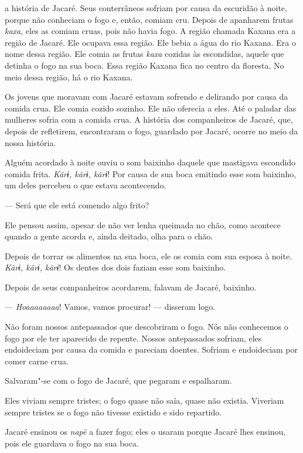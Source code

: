  

 a história de Jacaré. Seus conterrâneos sofriam por causa
da escuridão à noite, porque não conheciam o fogo e, então, comiam cru.
Depois de apanharem frutas \emph{kaxa}, eles as comiam cruas, pois não
havia fogo. A região chamada Kaxana era a região de Jacaré. Ele ocupava
essa região. Ele bebia a água do rio Kaxana. Era o nome dessa região.
Ele comia as frutas \emph{kaxa} cozidas às escondidas, aquele que
detinha o fogo na sua boca. Essa região Kaxana fica no centro da
floresta. No meio dessa região, há o rio Kaxana. 

Os jovens que moravam com Jacaré estavam sofrendo e delirando por causa
da comida crua. Ele comia cozido sozinho. Ele não oferecia a eles. Até o
paladar das mulheres sofria com a comida crua. A história dos
companheiros de Jacaré, que, depois de refletirem, encontraram o fogo,
guardado por Jacaré, ocorre no meio da nossa história. 

Alguém acordado à noite ouviu o som baixinho daquele que mastigava
escondido comida frita. \emph{Kãrɨ, kãrɨ, kãrɨ}! Por causa de sua boca
emitindo esse som baixinho, um deles percebeu o que estava acontecendo. 

--- Será que ele está comendo algo frito?

Ele pensou assim, apesar de não ver lenha queimada no chão, como
acontece quando a gente acorda e, ainda deitado, olha para o chão. 

Depois de torrar os alimentos na sua boca, ele os comia com sua esposa à
noite. \emph{Kãrɨ, kãrɨ, kãrɨ}! Os dentes dos dois faziam esse som
baixinho. 

Depois de seus companheiros acordarem, falavam de Jacaré, baixinho. 

--- \emph{Hoaaaaaaaa}! Vamos, vamos procurar! --- disseram logo. 

Não foram nossos antepassados que descobriram o fogo. Nós não conhecemos
o fogo por ele ter aparecido de repente. Nossos antepassados sofriam,
eles endoideciam por causa da comida e pareciam doentes. Sofriam e
endoideciam por comer carne crua. 

Salvaram"-se com o fogo de Jacaré, que pegaram e espalharam. 

Eles viviam sempre tristes; o fogo quase não saía, quase não existia.
Viveriam sempre tristes se o fogo não tivesse existido e sido
repartido. 

Jacaré ensinou os \emph{napë} a fazer fogo; eles o usaram porque Jacaré
lhes ensinou, pois ele guardava o fogo na sua boca.

